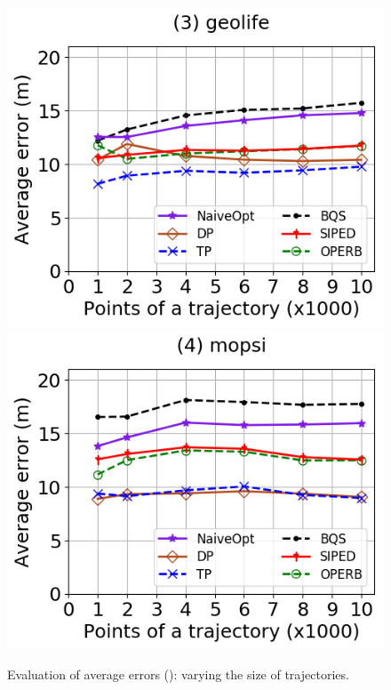 \begin{figure}[tb!]
	\includegraphics[scale=0.315]{Figures/Exp-PED-error-size-geolife.png}	\hspace{1ex}
	\includegraphics[scale=0.315]{Figures/Exp-PED-error-size-mopsi.png}		
	\vspace{-3ex}
	\caption{\small Evaluation of average errors (\ped): varying the size of
    trajectories.}
  \label{fig:ae-ped-size}
	\vspace{-2ex}
\end{figure}

